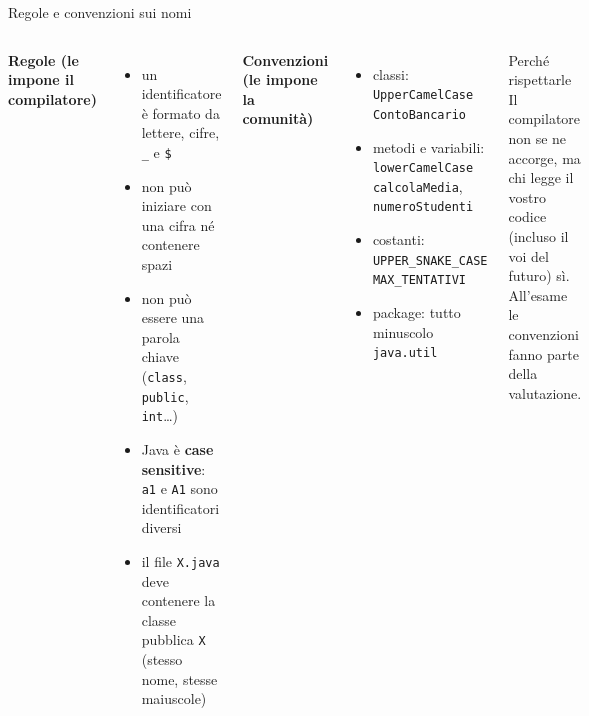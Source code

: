 \documentclass[10pt,aspectratio=169]{beamer}
\begin{document}
\begin{frame}{Regole e convenzioni sui nomi}
\begin{columns}[T]
\textbf{Regole (le impone il compilatore)}
\begin{itemize}\itemsep=2pt
    \item un identificatore è formato da lettere, cifre, \texttt{\_} e \texttt{\$}
    \item non può iniziare con una cifra né contenere spazi
    \item non può essere una parola chiave (\texttt{class}, \texttt{public}, \texttt{int}\ldots)
    \item Java è \textbf{case sensitive}: \texttt{a1} e \texttt{A1} sono identificatori diversi
    \item il file \texttt{X.java} deve contenere la classe pubblica \texttt{X} (stesso nome, stesse maiuscole)
\end{itemize}

\textbf{Convenzioni (le impone la comunità)}
\begin{itemize}\itemsep=2pt
    \item classi: \texttt{UpperCamelCase} \textrightarrow{} \texttt{ContoBancario}
    \item metodi e variabili: \texttt{lowerCamelCase} \textrightarrow{} \texttt{calcolaMedia}, \texttt{numeroStudenti}
    \item costanti: \texttt{UPPER\_SNAKE\_CASE} \textrightarrow{} \texttt{MAX\_TENTATIVI}
    \item package: tutto minuscolo \textrightarrow{} \texttt{java.util}
\end{itemize}

\vspace{0.3cm}
\begin{alertblock}{Perché rispettarle}
Il compilatore non se ne accorge, ma chi legge il vostro codice (incluso il voi del futuro) sì. All'esame le convenzioni fanno parte della valutazione.
\end{alertblock}
\end{columns}
\end{frame}
\end{document}
